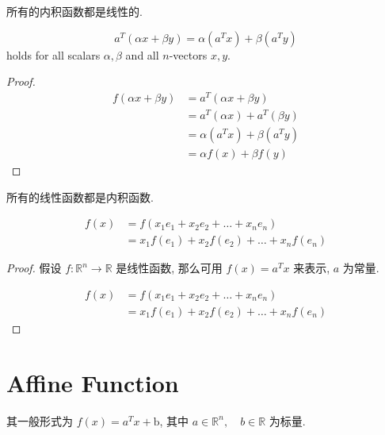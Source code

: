 \begin{corollary}
    所有的内积函数都是线性的.

    $$
a^{T}(\alpha x+\beta y)=\alpha\left(a^{T} x\right)+\beta\left(a^{T} y\right)
$$
holds for all scalars $ \alpha, \beta $ and all $ n $-vectors $ x, y $.
\end{corollary}

\begin{proof}
    $$ \begin{aligned} f(\alpha x+\beta y) &=a^{T}(\alpha x+\beta y) \\ &=a^{T}(\alpha x)+a^{T}(\beta y) \\ &=\alpha\left(a^{T} x\right)+\beta\left(a^{T} y\right) \\ &=\alpha f(x)+\beta f(y) \end{aligned} $$
\end{proof}


\begin{corollary}
    所有的线性函数都是内积函数.

    $$ \begin{aligned} f(x) &=f\left(x_{1} e_{1}+x_{2} e_{2}+\ldots+x_{n} e_{n}\right) \\ &=x_{1} f\left(e_{1}\right)+x_{2} f\left(e_{2}\right)+\ldots+x_{n} f\left(e_{n}\right) \end{aligned} $$
\end{corollary}

\begin{proof}
    假设 $ f: \mathbb{R}^{n} \rightarrow \mathbb{R} $ 是线性函数, 那么可用 $ f(x)=a^{T} x $ 来表示, $ a $ 为常量.

    $$ \begin{aligned} f(x) &=f\left(x_{1} e_{1}+x_{2} e_{2}+\ldots+x_{n} e_{n}\right) \\ &=x_{1} f\left(e_{1}\right)+x_{2} f\left(e_{2}\right)+\ldots+x_{n} f\left(e_{n}\right) \end{aligned} $$
\end{proof}


\section{Affine Function}


\begin{definition}
    其一般形式为 $ f(x)=a^{T} x+\mathrm{b} $, 其中 $ a \in \mathbb{R}^{n}, \quad b \in \mathbb{R} $ 为标量. 
\end{definition}

